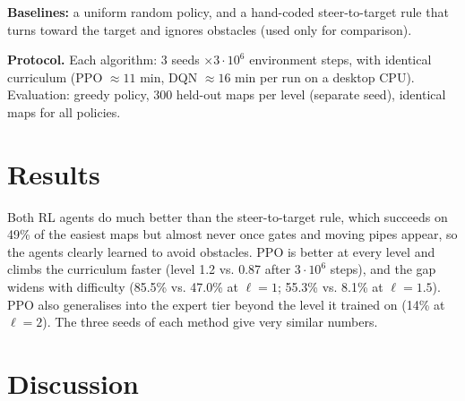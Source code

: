 \documentclass[10pt,a4paper,twocolumn]{article}
\begin{document}
\textbf{Baselines:} a uniform random policy, and a hand-coded
steer-to-target rule that turns toward the target and ignores
obstacles (used only for comparison).

\textbf{Protocol.} Each algorithm: 3 seeds
$\times3\cdot10^6$ environment steps, with identical curriculum
(PPO $\approx11$ min, DQN $\approx16$ min per run on a desktop
CPU). Evaluation: greedy policy, 300 held-out maps per level
(separate seed), identical maps for all policies.

\section{Results}

\begin{table}[H]
\centering
\caption{Success rate (\%) on unseen maps, mean $\pm$ std over 3 seeds.}
\label{tab:results}
\small
\setlength{\tabcolsep}{3.4pt}
\end{table}

Both RL agents do much better than the steer-to-target rule,
which succeeds on 49\% of the easiest maps but almost never once
gates and moving pipes appear, so the agents clearly learned to
avoid obstacles. PPO is better at every level and climbs the
curriculum faster (level 1.2 vs. 0.87 after $3\cdot10^6$ steps),
and the gap widens with difficulty (85.5\% vs. 47.0\% at
$\ell=1$; 55.3\% vs. 8.1\% at $\ell=1.5$). PPO also generalises
into the expert tier beyond the level it trained on (14\% at
$\ell=2$). The three seeds of each method give very similar numbers.

\section{Discussion}
\end{document}

